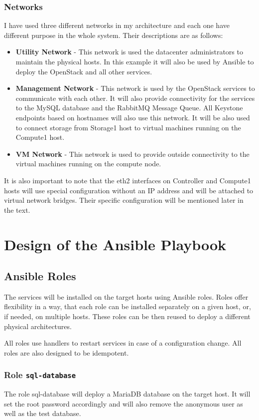 \subsubsection*{Networks}
I have used three different networks in my architecture and each one have different purpose in the whole system. Their descriptions are as follows:
\begin{itemize}
  \item{\textbf{Utility Network} - This network is used the datacenter administrators to maintain the physical hosts. In this example it will also be used by Ansible to deploy the OpenStack and all other services.}
  \item{\textbf{Management Network} - This network is used by the OpenStack services to communicate with each other. It will also provide connectivity for the services to the MySQL database and the RabbitMQ Message Queue. All Keystone endpoints based on hostnames will also use this network. It will be also used to connect storage from Storage1 host to virtual machines running on the Compute1 host.}
  \item{\textbf{VM Network} - This network is used to provide outside connectivity to the virtual machines running on the compute node.}
\end{itemize}
It is also important to note that the eth2 interfaces on Controller and Compute1 hosts will use special configuration without an IP address and will be attached to virtual network bridges. Their specific configuration will be mentioned later in the text.



\section{Design of the Ansible Playbook}
\subsection{Ansible Roles}
The services will be installed on the target hosts using Ansible roles. Roles offer flexibility in a way, that each role can be installed separately on a given host, or, if needed, on multiple hosts. These roles can be then reused to deploy a different physical architectures.

All roles use handlers to restart services in case of a configuration change. All roles are also designed to be idempotent.

\subsubsection*{Role \texttt{sql-database}}
The role sql-database will deploy a MariaDB database on the target host. It will set the root password accordingly and will also remove the anonymous user as well as the test database.

